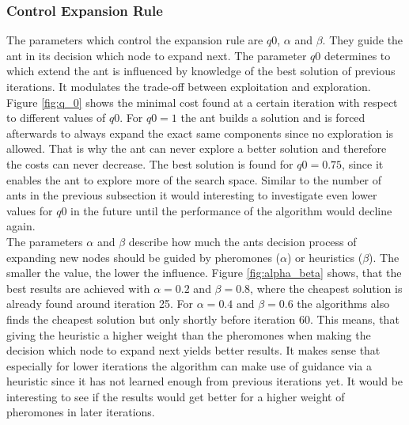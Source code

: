 \subsubsection{Control Expansion Rule}\label{expansion_rule}

The parameters which control the expansion rule are $q0$, $\alpha$ and $\beta$. They guide the ant in its decision which node to expand next. The parameter $q0$ determines to which extend the ant is influenced by knowledge of the best solution of previous iterations. It modulates the trade-off between exploitation and exploration. Figure \ref{fig:q_0} shows the minimal cost found at a certain iteration with respect to different values of $q0$. For $q0 = 1$ the ant builds a solution and is forced afterwards to always expand the exact same components since no exploration is allowed. That is why the ant can never explore a better solution and therefore the costs can never decrease. The best solution is found for $q0 = 0.75$, since it enables the ant to explore more of the search space. Similar to the number of ants in the previous subsection it would interesting to investigate even lower values for $q0$ in the future until the performance of the algorithm would decline again. \\

The parameters $\alpha$ and $\beta$ describe how much the ants decision process of expanding new nodes should be guided by pheromones ($\alpha$) or heuristics ($\beta$). The smaller the value, the lower the influence. Figure \ref{fig:alpha_beta} shows, that the best results are achieved with $\alpha = 0.2$ and $\beta = 0.8$, where the cheapest solution is already found around iteration 25. For $\alpha = 0.4$ and $\beta = 0.6$ the algorithms also finds the cheapest solution but only shortly before iteration 60. This means, that giving the heuristic a higher weight than the pheromones when making the decision which node to expand next yields better results. It makes sense that especially for lower iterations the algorithm can make use of guidance via a heuristic since it has not learned enough from previous iterations yet. It would be interesting to see if the results would get better for a higher weight of pheromones in later iterations.

